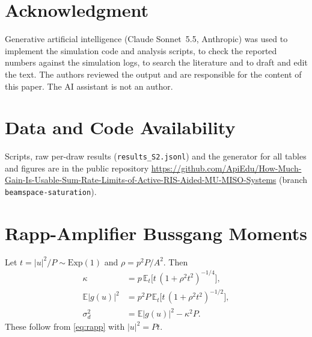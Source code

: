 \documentclass{ieeeaccess}
\newcommand{\E}{\mathbb{E}}
\begin{document}
\section*{Acknowledgment}
Generative artificial intelligence (Claude Sonnet~5.5, Anthropic) was used to implement the simulation code and analysis scripts, to check the reported numbers against the simulation logs, to search the literature and to draft and edit the text. The authors reviewed the output and are responsible for the content of this paper. The AI assistant is not an author.

\section*{Data and Code Availability}
Scripts, raw per-draw results (\texttt{results\_S2.jsonl}) and the generator for all tables and figures are in the public repository \url{https://github.com/ApiEdu/How-Much-Gain-Is-Usable-Sum-Rate-Limits-of-Active-RIS-Aided-MU-MISO-Systems} (branch \texttt{beamspace-saturation}).

\appendices
\section{Rapp-Amplifier Bussgang Moments}
Let $t=|u|^2/P\sim\mathrm{Exp}(1)$ and $\rho=p^2P/A^2$. Then
\begin{align}
\kappa&=p\,\E_t\!\bigl[t\,(1+\rho^2t^2)^{-1/4}\bigr],\\
\E|g(u)|^2&=p^2P\,\E_t\!\bigl[t\,(1+\rho^2t^2)^{-1/2}\bigr],\\
\sigma_d^2&=\E|g(u)|^2-\kappa^2P.
\end{align}
These follow from \eqref{eq:rapp} with $|u|^2=Pt$.
\end{document}
